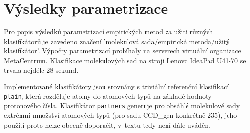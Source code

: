 \section{Výsledky parametrizace}
Pro popis výsledků parametrizací empirických metod za užití různých klasifikátorů je zavedeno značení 'molekulová sada/empirická metoda/užitý klasifikátor'. Výpočty parametrizací probíhaly na serverech virtuální organizace MetaCentrum. Klasifikace molekulových sad na stroji Lenovo IdeaPad U41-70 se trvala nejdéle 28 sekund.

Implementované klasifikátory jsou srovnány s triviální referenční klasifikací \verb|plain|, která rozděluje atomy do atomových typů na základě hodnoty protonového čísla. 
Klasifikátor \verb|partners| generuje pro obsáhlé molekulové sady extrémní množství atomových typů (pro sadu CCD\_gen konkrétně 235), jeho použití proto nelze obecně doporučit, v~textu tedy není dále uváděn. 

